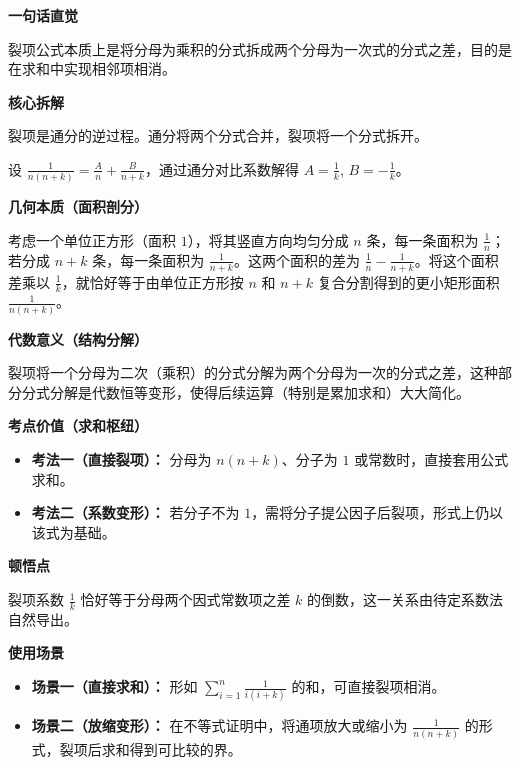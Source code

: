 \begin{explanationbox}
	\textbf{\textcolor{CExplanation}{一句话直觉}}

	裂项公式本质上是将分母为乘积的分式拆成两个分母为一次式的分式之差，目的是在求和中实现相邻项相消。

	\medskip
	\textbf{\textcolor{CExplanation}{核心拆解}}
	\begin{description}[style=nextline, leftmargin=2.8em, labelsep=0.5em, itemsep=0.45em]
		\item[\textbf{要点一（通分逆向）：}] 裂项是通分的逆过程。通分将两个分式合并，裂项将一个分式拆开。
		\item[\textbf{要点二（系数待定）：}] 设 $\frac{1}{n(n+k)} = \frac{A}{n} + \frac{B}{n+k}$，通过通分对比系数解得 $A = \frac{1}{k}$, $B = -\frac{1}{k}$。
	\end{description}

	\medskip
	\textbf{\textcolor{CExplanation}{几何本质（面积剖分）}}

	考虑一个单位正方形（面积 $1$），将其竖直方向均匀分成 $n$ 条，每一条面积为 $\frac{1}{n}$；若分成 $n+k$ 条，每一条面积为 $\frac{1}{n+k}$。这两个面积的差为 $\frac{1}{n} - \frac{1}{n+k}$。将这个面积差乘以 $\frac{1}{k}$，就恰好等于由单位正方形按 $n$ 和 $n+k$ 复合分割得到的更小矩形面积 $\frac{1}{n(n+k)}$。

	\medskip
	\textbf{\textcolor{CExplanation}{代数意义（结构分解）}}

	裂项将一个分母为二次（乘积）的分式分解为两个分母为一次的分式之差，这种部分分式分解是代数恒等变形，使得后续运算（特别是累加求和）大大简化。

	\medskip
	\textbf{\textcolor{CExplanation}{考点价值（求和枢纽）}}
	\begin{itemize}[leftmargin=*, itemsep=0.5em, topsep=0.4em]
		\item \textbf{考法一（直接裂项）：} 分母为 $n(n+k)$、分子为 $1$ 或常数时，直接套用公式求和。
		\item \textbf{考法二（系数变形）：} 若分子不为 $1$，需将分子提公因子后裂项，形式上仍以该式为基础。
	\end{itemize}

	\medskip
	\textbf{\textcolor{CExplanation}{顿悟点}}

	裂项系数 $\frac{1}{k}$ 恰好等于分母两个因式常数项之差 $k$ 的倒数，这一关系由待定系数法自然导出。

	\medskip
	\textbf{\textcolor{CExplanation}{使用场景}}
	\begin{itemize}[leftmargin=*, itemsep=0.5em, topsep=0.4em]
		\item \textbf{场景一（直接求和）：} 形如 $\sum_{i=1}^n \frac{1}{i(i+k)}$ 的和，可直接裂项相消。
		\item \textbf{场景二（放缩变形）：} 在不等式证明中，将通项放大或缩小为 $\frac{1}{n(n+k)}$ 的形式，裂项后求和得到可比较的界。
	\end{itemize}
\end{explanationbox}
